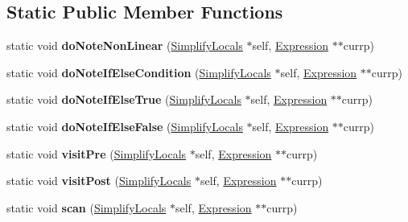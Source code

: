 \subsection*{Static Public Member Functions}
\begin{DoxyCompactItemize}
\item 
\mbox{\label{structwasm_1_1_simplify_locals_a27d130c8cdcee0d90012fa75a8d4d415}} 
static void {\bfseries do\+Note\+Non\+Linear} (\mbox{\hyperlink{structwasm_1_1_simplify_locals}{Simplify\+Locals}} $\ast$self, \mbox{\hyperlink{classwasm_1_1_expression}{Expression}} $\ast$$\ast$currp)
\item 
\mbox{\label{structwasm_1_1_simplify_locals_aadc6c07ad887d106645d28e335d53dfb}} 
static void {\bfseries do\+Note\+If\+Else\+Condition} (\mbox{\hyperlink{structwasm_1_1_simplify_locals}{Simplify\+Locals}} $\ast$self, \mbox{\hyperlink{classwasm_1_1_expression}{Expression}} $\ast$$\ast$currp)
\item 
\mbox{\label{structwasm_1_1_simplify_locals_a2e8a1dca86231d0f0ada179c65131e49}} 
static void {\bfseries do\+Note\+If\+Else\+True} (\mbox{\hyperlink{structwasm_1_1_simplify_locals}{Simplify\+Locals}} $\ast$self, \mbox{\hyperlink{classwasm_1_1_expression}{Expression}} $\ast$$\ast$currp)
\item 
\mbox{\label{structwasm_1_1_simplify_locals_a882c727c1d2049badc5bba01627f2225}} 
static void {\bfseries do\+Note\+If\+Else\+False} (\mbox{\hyperlink{structwasm_1_1_simplify_locals}{Simplify\+Locals}} $\ast$self, \mbox{\hyperlink{classwasm_1_1_expression}{Expression}} $\ast$$\ast$currp)
\item 
\mbox{\label{structwasm_1_1_simplify_locals_ae9dbf92d8464ca4c73c52851b8da2053}} 
static void {\bfseries visit\+Pre} (\mbox{\hyperlink{structwasm_1_1_simplify_locals}{Simplify\+Locals}} $\ast$self, \mbox{\hyperlink{classwasm_1_1_expression}{Expression}} $\ast$$\ast$currp)
\item 
\mbox{\label{structwasm_1_1_simplify_locals_a62a96aaf8040ba757ba84334aa1835fe}} 
static void {\bfseries visit\+Post} (\mbox{\hyperlink{structwasm_1_1_simplify_locals}{Simplify\+Locals}} $\ast$self, \mbox{\hyperlink{classwasm_1_1_expression}{Expression}} $\ast$$\ast$currp)
\item 
\mbox{\label{structwasm_1_1_simplify_locals_aafccdb5a7a7b234ae45faa4aedb23e92}} 
static void {\bfseries scan} (\mbox{\hyperlink{structwasm_1_1_simplify_locals}{Simplify\+Locals}} $\ast$self, \mbox{\hyperlink{classwasm_1_1_expression}{Expression}} $\ast$$\ast$currp)
\end{DoxyCompactItemize}
